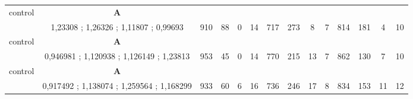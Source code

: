 \begin{table}[]
{\begin{tabular}{|c|c|c|c|c|c|c|c|c|c|c|c|c|c|}
control & \cellcolor{blue!15}\textbf{A}& {\color[HTML]{00009B} } & {\color[HTML]{9A0000} } & {\color[HTML]{009901} } &  & {\color[HTML]{00009B} } & {\color[HTML]{9A0000} } & {\color[HTML]{009901} } &  & {\color[HTML]{00009B} } & {\color[HTML]{9A0000} } & {\color[HTML]{009901} } &  \\ 
 & \cellcolor{ blue!15}1,23308 ; 1,26326 ; 1,11807 ; 0,99693 & \multirow{-2}{*}{{\color[HTML]{00009B} 910}} & \multirow{-2}{*}{{\color[HTML]{9A0000} 88}} & \multirow{-2}{*}{{\color[HTML]{009901} 0}} & \multirow{-2}{*}{14} & \multirow{-2}{*}{{\color[HTML]{00009B} 717}} & \multirow{-2}{*}{{\color[HTML]{9A0000} 273}} & \multirow{-2}{*}{{\color[HTML]{009901} 8}} & \multirow{-2}{*}{7} & \multirow{-2}{*}{{\color[HTML]{00009B} 814}} & \multirow{-2}{*}{{\color[HTML]{9A0000} 181}} & \multirow{-2}{*}{{\color[HTML]{009901} 4}} & \multirow{-2}{*}{10} \\ \hline

control & \cellcolor{blue!15}\textbf{A}& {\color[HTML]{00009B} } & {\color[HTML]{9A0000} } & {\color[HTML]{009901} } &  & {\color[HTML]{00009B} } & {\color[HTML]{9A0000} } & {\color[HTML]{009901} } &  & {\color[HTML]{00009B} } & {\color[HTML]{9A0000} } & {\color[HTML]{009901} } &  \\ 
 & \cellcolor{ blue!15}0,946981 ; 1,120938 ; 1,126149 ; 1,23813 & \multirow{-2}{*}{{\color[HTML]{00009B} 953}} & \multirow{-2}{*}{{\color[HTML]{9A0000} 45}} & \multirow{-2}{*}{{\color[HTML]{009901} 0}} & \multirow{-2}{*}{14} & \multirow{-2}{*}{{\color[HTML]{00009B} 770}} & \multirow{-2}{*}{{\color[HTML]{9A0000} 215}} & \multirow{-2}{*}{{\color[HTML]{009901} 13}} & \multirow{-2}{*}{7} & \multirow{-2}{*}{{\color[HTML]{00009B} 862}} & \multirow{-2}{*}{{\color[HTML]{9A0000} 130}} & \multirow{-2}{*}{{\color[HTML]{009901} 7}} & \multirow{-2}{*}{10} \\ \hline

control & \cellcolor{blue!15}\textbf{A}& {\color[HTML]{00009B} } & {\color[HTML]{9A0000} } & {\color[HTML]{009901} } &  & {\color[HTML]{00009B} } & {\color[HTML]{9A0000} } & {\color[HTML]{009901} } &  & {\color[HTML]{00009B} } & {\color[HTML]{9A0000} } & {\color[HTML]{009901} } &  \\ 
 & \cellcolor{ blue!15}0,917492 ; 1,138074 ; 1,259564 ; 1,168299 & \multirow{-2}{*}{{\color[HTML]{00009B} 933}} & \multirow{-2}{*}{{\color[HTML]{9A0000} 60}} & \multirow{-2}{*}{{\color[HTML]{009901} 6}} & \multirow{-2}{*}{16} & \multirow{-2}{*}{{\color[HTML]{00009B} 736}} & \multirow{-2}{*}{{\color[HTML]{9A0000} 246}} & \multirow{-2}{*}{{\color[HTML]{009901} 17}} & \multirow{-2}{*}{8} & \multirow{-2}{*}{{\color[HTML]{00009B} 834}} & \multirow{-2}{*}{{\color[HTML]{9A0000} 153}} & \multirow{-2}{*}{{\color[HTML]{009901} 11}} & \multirow{-2}{*}{12} \\ \hline



\end{tabular}}
\end{table}
